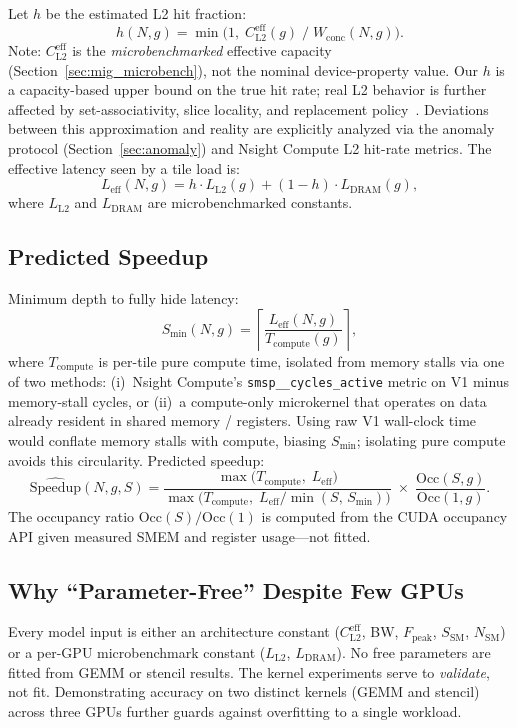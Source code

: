 \documentclass[sigplan,nonacm,10pt]{acmart}
\begin{document}
Let $h$ be the estimated L2 hit fraction:
\[
  h(N,g) = \min\!\bigl(1,\;
  C_{\text{L2}}^{\text{eff}}(g) \;/\; W_{\text{conc}}(N,g)\bigr).
\]
Note: $C_{\text{L2}}^{\text{eff}}$ is the \emph{microbenchmarked}
effective capacity (Section~\ref{sec:mig_microbench}), not the nominal
device-property value.
Our $h$ is a capacity-based upper bound on the true hit rate; real L2
behavior is further affected by set-associativity, slice locality, and
replacement policy~\cite{gpu_noc}.
Deviations between this approximation and reality are explicitly
analyzed via the anomaly protocol (Section~\ref{sec:anomaly}) and
Nsight Compute L2 hit-rate metrics.
The effective latency seen by a tile load is:
\[
  L_{\text{eff}}(N,g) = h \cdot L_{\text{L2}}(g)
  + (1 - h) \cdot L_{\text{DRAM}}(g),
\]
where $L_{\text{L2}}$ and $L_{\text{DRAM}}$ are microbenchmarked
constants.

\subsection{Predicted Speedup}

Minimum depth to fully hide latency:
\[
  S_{\min}(N,g) = \left\lceil
  \frac{L_{\text{eff}}(N,g)}{T_{\text{compute}}(g)}
  \right\rceil,
\]
where $T_{\text{compute}}$ is per-tile pure compute time, isolated from
memory stalls via one of two methods:
(i)~Nsight Compute's \texttt{smsp\_\_cycles\_active} metric on V1
minus memory-stall cycles, or
(ii)~a compute-only microkernel that operates on data already resident
in shared memory / registers.
Using raw V1 wall-clock time would conflate memory stalls with compute,
biasing $S_{\min}$; isolating pure compute avoids this circularity.
Predicted speedup:
\[
  \widehat{\text{Speedup}}(N, g, S) =
  \frac{\max\bigl(T_{\text{compute}},\; L_{\text{eff}}\bigr)}
  {\max\bigl(T_{\text{compute}},\;
   L_{\text{eff}} / \min(S,\, S_{\min})\bigr)}
  \;\times\;
  \frac{\text{Occ}(S,g)}{\text{Occ}(1,g)}.
\]
The occupancy ratio $\text{Occ}(S)/\text{Occ}(1)$ is computed from the
CUDA occupancy API given measured SMEM and register usage---not fitted.

\subsection{Why ``Parameter-Free'' Despite Few GPUs}

Every model input is either an architecture constant
($C_{\text{L2}}^{\text{eff}}$, BW, $F_{\text{peak}}$, $S_{\text{SM}}$,
$N_{\text{SM}}$) or a per-GPU microbenchmark constant ($L_{\text{L2}}$,
$L_{\text{DRAM}}$).
No free parameters are fitted from GEMM or stencil results.
The kernel experiments serve to \emph{validate}, not fit.
Demonstrating accuracy on two distinct kernels (GEMM and stencil)
across three GPUs further guards against overfitting to a single
workload.
\end{document}
